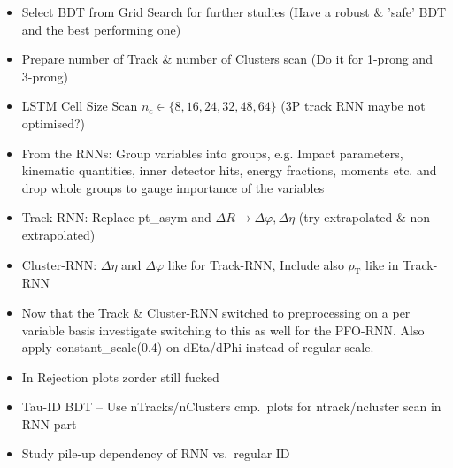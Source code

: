 \begin{itemize}
\item Select BDT from Grid Search for further studies (Have a robust \& 'safe'
  BDT and the best performing one)
\item Prepare number of Track \& number of Clusters scan (Do it for 1-prong and
  3-prong)
\item LSTM Cell Size Scan $n_c \in \{8, 16, 24, 32, 48, 64\}$ (3P track RNN
  maybe not optimised?)
\item From the RNNs: Group variables into groups, e.g. Impact parameters,
  kinematic quantities, inner detector hits, energy fractions, moments etc. and
  drop whole groups to gauge importance of the variables
\item Track-RNN: Replace pt\_asym and $\Delta R \rightarrow \Delta\varphi,
  \Delta\eta$ (try extrapolated \& non-extrapolated)
\item Cluster-RNN: $\Delta\eta$ and $\Delta\varphi$ like for Track-RNN, Include
  also $p_\text{T}$ like in Track-RNN
\item Now that the Track \& Cluster-RNN switched to preprocessing on a per
  variable basis investigate switching to this as well for the PFO-RNN. Also
  apply constant\_scale(0.4) on dEta/dPhi instead of regular scale.
\item In Rejection plots zorder still fucked
\item Tau-ID BDT -- Use nTracks/nClusters cmp.\ plots for ntrack/ncluster scan
  in RNN part
\item Study pile-up dependency of RNN vs.\ regular ID
\end{itemize}


